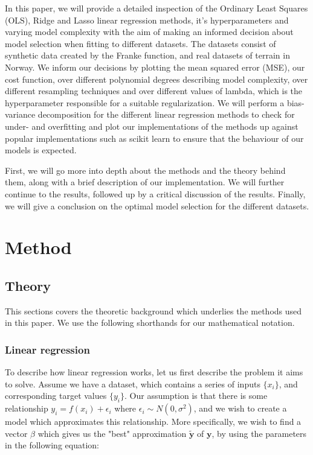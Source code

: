 \documentclass[twocolumn,10pt,cleanfoot]{asme2ej}
\begin{document}
In this paper, we will provide a detailed inspection of the Ordinary Least Squares (OLS), Ridge and Lasso linear regression methods, it's hyperparameters and varying model complexity with the aim of making an informed decision about model selection when fitting to different datasets. The datasets consist of synthetic data created by the Franke function, and real datasets of terrain in Norway. We inform our decisions by plotting the mean squared error (MSE), our cost function, over different polynomial degrees describing model complexity, over different resampling techniques and over different values of lambda, which is the hyperparameter responsible for a suitable regularization. We will perform a bias-variance decomposition for the different linear regression methods to check for under- and overfitting and plot our implementations of the methods up against popular implementations such as scikit learn to ensure that the behaviour of our models is expected.

First, we will go more into depth about the methods and the theory behind them, along with a brief description of our implementation. We will further continue to the results, followed up by a critical discussion of the results. Finally, we will give a conclusion on the optimal model selection for the different datasets.





\section{Method}

\subsection{Theory}

This sections covers the theoretic background which underlies the methods used in this paper. We use the following shorthands for our mathematical notation.

\subsubsection{Linear regression}

To describe how linear regression works, let us first describe the problem it aims to solve. Assume we have a dataset, which contains a series of inputs $\{x_i\}$, and corresponding target values $\{y_i\}$. Our assumption is that there is some relationship $y_i = f(x_i) + \epsilon_i$ where $\epsilon_i \sim N(0,\sigma^2)$, and we wish to create a model which approximates this relationship. More specifically, we wish to find a vector $\beta$ which gives us the "best" approximation $\bm{\tilde{y}}$ of $\bm{y}$, by using the parameters in the following equation:
\end{document}

